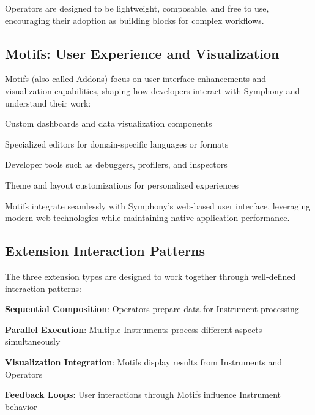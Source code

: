 Operators are designed to be lightweight, composable, and free to use, encouraging their adoption as building blocks for complex workflows.

\subsection*{Motifs: User Experience and Visualization}

\textcolor{brandAccent}{Motifs} (also called Addons) focus on user interface enhancements and visualization capabilities, shaping how developers interact with Symphony and understand their work:

\begin{infobox}[title=Motif Capabilities]
\begin{compactlist}
    \item Custom dashboards and data visualization components
    \item Specialized editors for domain-specific languages or formats
    \item Developer tools such as debuggers, profilers, and inspectors
    \item Theme and layout customizations for personalized experiences
\end{compactlist}
\end{infobox}

Motifs integrate seamlessly with Symphony's web-based user interface, leveraging modern web technologies while maintaining native application performance.

\subsection*{Extension Interaction Patterns}

The three extension types are designed to work together through well-defined interaction patterns:

\begin{compactlist}
    \item \textbf{Sequential Composition}: Operators prepare data for Instrument processing
    \item \textbf{Parallel Execution}: Multiple Instruments process different aspects simultaneously
    \item \textbf{Visualization Integration}: Motifs display results from Instruments and Operators
    \item \textbf{Feedback Loops}: User interactions through Motifs influence Instrument behavior
\end{compactlist}

